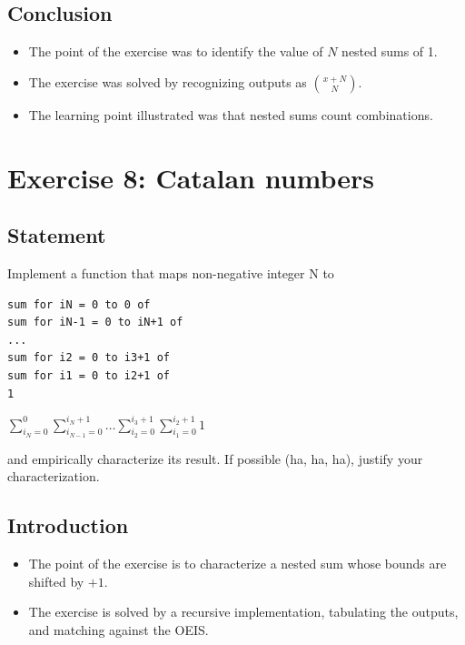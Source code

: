 \documentclass[12pt]{article}
\begin{document}

\subsection{Conclusion}

\begin{itemize}

\item
  The point of the exercise was to identify the value of $N$ nested sums of 1.

\item
  The exercise was solved by recognizing outputs as $\binom{x + N}{N}$.

\item
  The learning point illustrated was that nested sums count combinations.

\end{itemize}


\newpage

\section{Exercise 8: Catalan numbers}


\subsection{Statement}

Implement a function that maps non-negative integer N to

\begin{verbatim}
sum for iN = 0 to 0 of
sum for iN-1 = 0 to iN+1 of
...
sum for i2 = 0 to i3+1 of
sum for i1 = 0 to i2+1 of
1
\end{verbatim}

$\displaystyle\sum_{i_{N}=0}^{0}\sum_{i_{N-1}=0}^{i_{N}+1}\dots\sum_{i_{2}=0}^{i_{3}+1}\sum_{i_{1}=0}^{i_{2}+1}1$

and empirically characterize its result. If possible (ha, ha, ha), justify your
characterization.


\subsection{Introduction}

\begin{itemize}

\item
  The point of the exercise is to characterize a nested sum whose bounds are shifted by $+1$.

\item
  The exercise is solved by a recursive implementation, tabulating the outputs, and matching against the OEIS.

\end{itemize}
\end{document}

